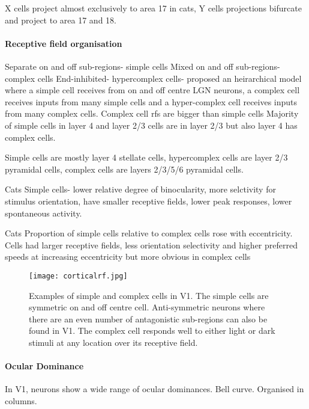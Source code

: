 \cite{Stone1973} X cells project almost exclusively to area 17 in cats, Y cells projections bifurcate and project to area 17 and 18. 

\paragraph{Receptive field organisation}

Separate on and off sub-regions- simple cells
Mixed on and off sub-regions- complex cells
End-inhibited- hypercomplex cells- proposed an heirarchical model where a simple cell receives from on and off centre LGN neurons, a complex cell receives inputs from many simple cells and a hyper-complex cell receives inputs from many complex cells. 
Complex cell rfs are bigger than simple cells
Majority of simple cells in layer 4 and layer 2/3 cells are in layer 2/3 but also layer 4 has complex cells.

\cite{Kelly1974} Simple cells are mostly layer 4 stellate cells, hypercomplex cells are layer 2/3 pyramidal cells, complex cells are layers 2/3/5/6 pyramidal cells. 

\cite{Leventhal1978} Cats Simple cells- lower relative degree of binocularity, more selctivity for stimulus orientation, have smaller receptive fields, lower peak responses, lower spontaneous activity.

\cite{Wilson1976a} Cats Proportion of simple cells relative to complex cells rose with eccentricity. Cells had larger receptive fields, less orientation selectivity and higher preferred speeds at increasing eccentricity but more obvious in complex cells
\begin{figure}[H]
	
	\texttt{[image: corticalrf.jpg]}
	\centering
	\caption{Examples of simple and complex cells in V1. The simple cells are symmetric on and off centre cell. Anti-symmetric neurons where there are an even number of antagonistic sub-regions can also be found in V1. The complex cell responds well to either light or dark stimuli at any location over its receptive field.}
	
	\label{fig:rforgV1}
\end{figure}

\paragraph{Ocular Dominance}
In V1, neurons show a wide range of ocular dominances. Bell curve. Organised in columns.

